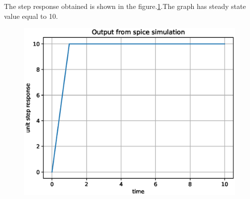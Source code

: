\begin{enumerate}[label=\arabic*.,ref=\theenumi]
\begin{lstlisting}
\end{lstlisting}
The step response obtained is shown in the figure.\ref{fig:ee18btech11005_3}.The graph has steady state value equal to 10.
\begin{figure}[!ht]
\centering
\includegraphics[width=\columnwidth]{./figs/ee18btech11005/ee18btech11005_spice.eps}
\caption{}
\label{fig:ee18btech11005_3}
\end{figure}

\end{enumerate}

